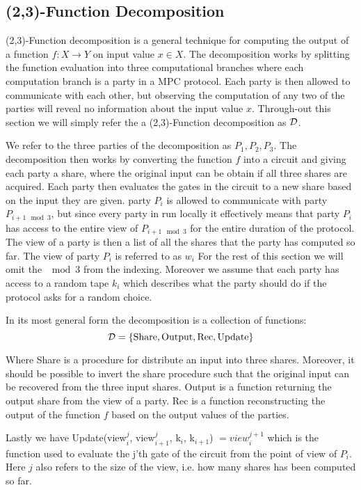 \subsection{(2,3)-Function Decomposition}
\label{subsec:decomposition}
(2,3)-Function decomposition is a general technique for computing the output of
a function $f : X \rightarrow Y$ on input value $x \in X$.
The decomposition works by splitting the function evaluation into three
computational branches where each computation branch is a party in a MPC
protocol. Each party is then allowed to communicate with each other, but
observing the computation of any two of the parties will reveal no information
about the input value $x$.
Through-out this section we will simply refer the a (2,3)-Function decomposition
as $\mathcal{D}$.

We refer to the three parties of the decomposition as $P_{1}, P_{2}, P_{3}$. The
decomposition then works by converting the function $f$ into a circuit and
giving each party a share, where the original input can be obtain if all three
shares are acquired. Each party then evaluates the gates in the circuit to a new
share based on the input they are given. party $P_{i}$ is allowed to communicate
with party $P_{i+1 \mod 3}$, but since every party in run locally it effectively
means that party $P_{i}$ has access to the entire view of $P_{i+1 \mod 3}$ for
the entire duration of the protocol. The view of a party is then a list  of all the shares that
the party has computed so far. The view of party $P_{i}$ is referred to as
$w_{i}$ For the rest of this section we will omit the $\mod 3$ from the
indexing. Moreover we assume that each party has access to a random tape $k_{i}$
which describes what the party should do if the protocol asks for a random
choice.

\begin{definition}
  In its most general form the decomposition is a collection of functions:
  \[
    \mathcal{D} = \{\text{Share}, \text{Output}, \text{Rec}, \text{Update}\}
  \]

  Where Share is a procedure for distribute an input into three shares.
  Moreover, it should be possible to invert the share procedure such that the
  original input can be recovered from the three input shares.
  Output is a function returning the output share from the view of a party.
  Rec is a function reconstructing the output of the function $f$ based on the
  output values of the parties.

  Lastly we have Update(view$^{j}_{i}$, view$^{j}_{i+1}$, k$_{i}$, k$_{i+1}$) $= view^{j+1}_{i}$ which
  is the function used to evaluate the j'th gate of the circuit from the point
  of view of $P_{i}$. Here
  $j$ also refers to the size of the view, i.e. how many shares has been
  computed so far.
\end{definition}

